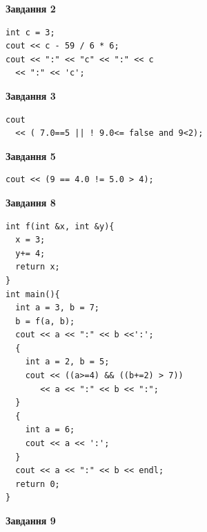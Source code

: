 \documentclass[12pt, ukrainian]{article}
\begin{document}
{\begin {large}
\begin{minipage}[t]{7.0cm}
\end{minipage}
\vline \hspace{1mm}
\begin{minipage}[t]{11.0cm}

\begin{center}
\textbf{Завдання 2}
\end{center}
\vspace{-8mm}

\begin{verbatim}
int c = 3;
cout << c - 59 / 6 * 6;
cout << ":" << "c" << ":" << c 
  << ":" << 'c';
\end{verbatim}



\begin{center}
\textbf{Завдання 3}
\end{center}
\vspace{-8mm}

\begin{verbatim}
cout 
  << ( 7.0==5 || ! 9.0<= false and 9<2);
\end{verbatim}



\begin{center}
\textbf{Завдання 5}
\end{center}
\vspace{-8mm}

\begin{verbatim}
cout << (9 == 4.0 != 5.0 > 4);
\end{verbatim}



\begin{center}
\textbf{Завдання 8}
\end{center}
\vspace{-8mm}

\begin{verbatim}
int f(int &x, int &y){
  x = 3;
  y+= 4;
  return x;
}
int main(){
  int a = 3, b = 7;
  b = f(a, b);
  cout << a << ":" << b <<':';
  {
    int a = 2, b = 5;
    cout << ((a>=4) && ((b+=2) > 7))
       << a << ":" << b << ":";
  }
  {
    int a = 6;
    cout << a << ':';
  }
  cout << a << ":" << b << endl;
  return 0;
}
\end{verbatim}

\end{minipage}


\begin{minipage}[t]{7.0cm}

\begin{center}
\textbf{Завдання 9}
\end{center}
\vspace{-8mm}


\end{minipage}
\end{large}}
\end{document}
